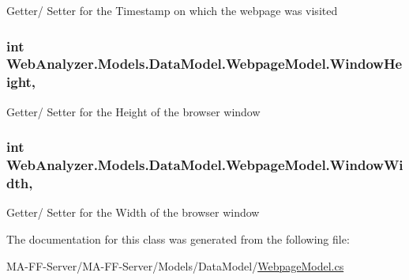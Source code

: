 Getter/ Setter for the Timestamp on which the webpage was visited 

\hypertarget{class_web_analyzer_1_1_models_1_1_data_model_1_1_webpage_model_a76b6e0896f14f8d7c0d7bf94b94ec058}{}
\subsubsection[{Window\+Height}]{\setlength{\rightskip}{0pt plus 5cm}int Web\+Analyzer.\+Models.\+Data\+Model.\+Webpage\+Model.\+Window\+Height\hspace{0.3cm}{\ttfamily [get]}, {\ttfamily [set]}}\label{class_web_analyzer_1_1_models_1_1_data_model_1_1_webpage_model_a76b6e0896f14f8d7c0d7bf94b94ec058}


Getter/ Setter for the Height of the browser window 

\hypertarget{class_web_analyzer_1_1_models_1_1_data_model_1_1_webpage_model_a3e3926562c05a94a3111f3a07cd8e131}{}
\subsubsection[{Window\+Width}]{\setlength{\rightskip}{0pt plus 5cm}int Web\+Analyzer.\+Models.\+Data\+Model.\+Webpage\+Model.\+Window\+Width\hspace{0.3cm}{\ttfamily [get]}, {\ttfamily [set]}}\label{class_web_analyzer_1_1_models_1_1_data_model_1_1_webpage_model_a3e3926562c05a94a3111f3a07cd8e131}


Getter/ Setter for the Width of the browser window 



The documentation for this class was generated from the following file\+:\begin{DoxyCompactItemize}
\item 
M\+A-\/\+F\+F-\/\+Server/\+M\+A-\/\+F\+F-\/\+Server/\+Models/\+Data\+Model/\hyperlink{_webpage_model_8cs}{Webpage\+Model.\+cs}\end{DoxyCompactItemize}
